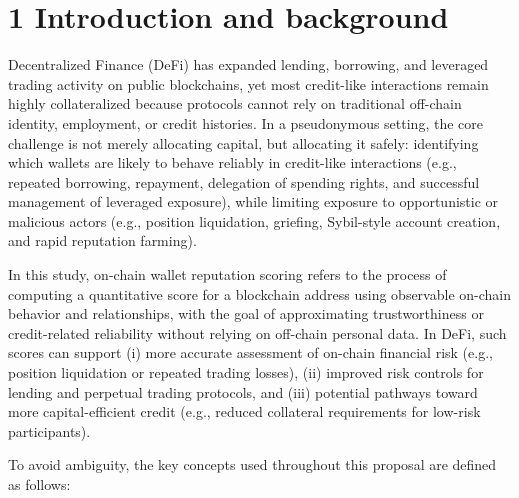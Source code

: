 \clearpage
{}
\section*{1 \textbf{Introduction and background}}
\label{sec:introduction-and-background}

Decentralized Finance (DeFi) has expanded lending, borrowing, and leveraged trading activity on public blockchains, yet most credit-like interactions remain highly collateralized because protocols cannot rely on traditional off-chain identity, employment, or credit histories. In a pseudonymous setting, the core challenge is not merely allocating capital, but allocating it safely: identifying which wallets are likely to behave reliably in credit-like interactions (e.g., repeated borrowing, repayment, delegation of spending rights, and successful management of leveraged exposure), while limiting exposure to opportunistic or malicious actors (e.g., position liquidation, griefing, Sybil-style account creation, and rapid reputation farming).


In this study, on-chain wallet reputation scoring refers to the process of computing a quantitative score for a blockchain address using observable on-chain behavior and relationships, with the goal of approximating trustworthiness or credit-related reliability without relying on off-chain personal data. In DeFi, such scores can support (i) more accurate assessment of on-chain financial risk (e.g., position liquidation or repeated trading losses), (ii) improved risk controls for lending and perpetual trading protocols, and (iii) potential pathways toward more capital-efficient credit (e.g., reduced collateral requirements for low-risk participants).


To avoid ambiguity, the key concepts used throughout this proposal are defined as follows:


